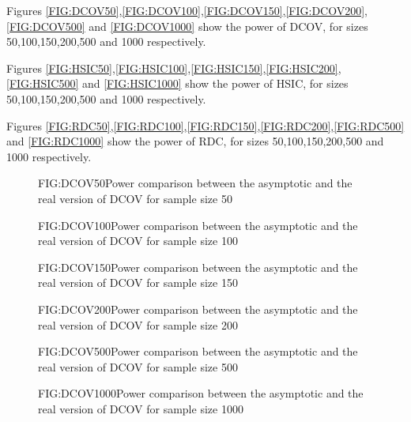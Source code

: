 Figures \ref{FIG:DCOV50},\ref{FIG:DCOV100},\ref{FIG:DCOV150},\ref{FIG:DCOV200},\ref{FIG:DCOV500} and \ref{FIG:DCOV1000} show the power of DCOV,  for sizes 50,100,150,200,500 and 1000 respectively.

Figures \ref{FIG:HSIC50},\ref{FIG:HSIC100},\ref{FIG:HSIC150},\ref{FIG:HSIC200},\ref{FIG:HSIC500} and \ref{FIG:HSIC1000} show the power of HSIC,  for sizes 50,100,150,200,500 and 1000 respectively.

Figures \ref{FIG:RDC50},\ref{FIG:RDC100},\ref{FIG:RDC150},\ref{FIG:RDC200},\ref{FIG:RDC500} and \ref{FIG:RDC1000} show the power of RDC,  for sizes 50,100,150,200,500 and 1000 respectively.

\begin{figure}[DCOV asymptotic size 50]{FIG:DCOV50}{Power comparison between the asymptotic and the real version of DCOV for sample size 50}
\end{figure}
\begin{figure}[DCOV asymptotic size 100]{FIG:DCOV100}{Power comparison between the asymptotic and the real version of DCOV for sample size 100}
\end{figure}
\begin{figure}[DCOV asymptotic size 150]{FIG:DCOV150}{Power comparison between the asymptotic and the real version of DCOV for sample size 150}
\end{figure}
\begin{figure}[DCOV asymptotic size 200]{FIG:DCOV200}{Power comparison between the asymptotic and the real version of DCOV for sample size 200}
\end{figure}
\begin{figure}[DCOV asymptotic size 500]{FIG:DCOV500}{Power comparison between the asymptotic and the real version of DCOV for sample size 500}
\end{figure}
\begin{figure}[DCOV asymptotic size 1000]{FIG:DCOV1000}{Power comparison between the asymptotic and the real version of DCOV for sample size 1000}
\end{figure}

